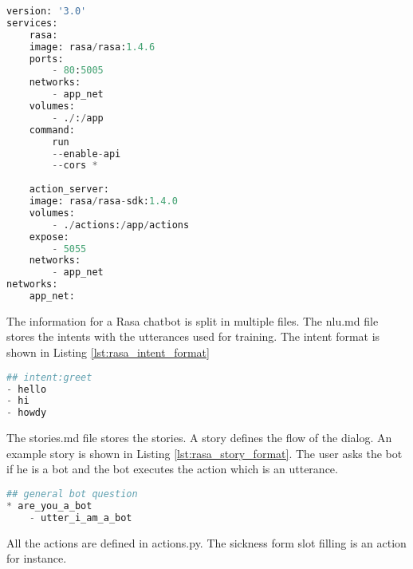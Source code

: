 \begin{lstlisting}[caption={Rasa Docker Compose File}, label={lst:rasa_docker},captionpos=b,frame=single,language={Python},commentstyle=\color{mygreen},keywordstyle=\color{blue},
    morekeywords={}]                
version: '3.0'
services:
    rasa:
    image: rasa/rasa:1.4.6
    ports:
        - 80:5005
    networks: 
        - app_net
    volumes:
        - ./:/app
    command:
        run 
        --enable-api
        --cors *
    
    action_server:
    image: rasa/rasa-sdk:1.4.0    
    volumes:
        - ./actions:/app/actions
    expose: 
        - 5055
    networks: 
        - app_net
networks: 
    app_net:
\end{lstlisting}  
The information for a Rasa chatbot is split in multiple files.
The nlu.md file stores the intents with the utterances used for training.
The intent format is shown in Listing \ref{lst:rasa_intent_format}
\begin{lstlisting}[caption={Rasa Intent Format}, label={lst:rasa_intent_format},captionpos=b,frame=single,language={Python},commentstyle=\color{mygreen},keywordstyle=\color{blue},
    morekeywords={}]                
## intent:greet
- hello
- hi 
- howdy
\end{lstlisting} 
The stories.md file stores the stories. 
A story defines the flow of the dialog.
An example story is shown in Listing \ref{lst:rasa_story_format}.
The user asks the bot if he is a bot and the bot executes the action 
which is an utterance.
\begin{lstlisting}[caption={Rasa Story Format}, label={lst:rasa_story_format},captionpos=b,frame=single,language={Python},commentstyle=\color{mygreen},keywordstyle=\color{blue},
    morekeywords={}]                
## general bot question
* are_you_a_bot
    - utter_i_am_a_bot
\end{lstlisting} 
All the actions are defined in actions.py.
The sickness form slot filling is an action for instance.


